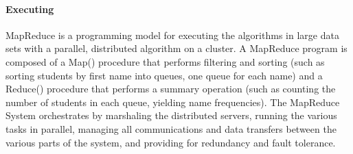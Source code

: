 \documentclass{article} %
\begin{document}
      
\paragraph{Executing}MapReduce is a programming model for executing the algorithms in large data sets with a parallel, distributed algorithm on a cluster. A MapReduce program is composed of a Map() procedure that performs filtering and sorting (such as sorting students by first name into queues, one queue for each name) and a Reduce() procedure that performs a summary operation (such as counting the number of students in each queue, yielding name frequencies). The MapReduce System orchestrates by marshaling the distributed servers, running the various tasks in parallel, managing all communications and data transfers between the various parts of the system, and providing for redundancy and fault tolerance.
\end{document}
